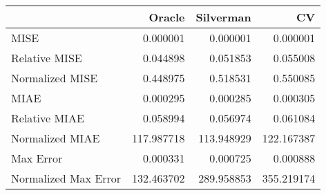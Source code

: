 \begin{tabular}{lrrr}
  \hline
 & Oracle & Silverman & CV \\ 
  \hline
MISE & 0.000001 & 0.000001 & 0.000001 \\ 
  Relative MISE & 0.044898 & 0.051853 & 0.055008 \\ 
  Normalized MISE & 0.448975 & 0.518531 & 0.550085 \\ 
  MIAE & 0.000295 & 0.000285 & 0.000305 \\ 
  Relative MIAE & 0.058994 & 0.056974 & 0.061084 \\ 
  Normalized MIAE & 117.987718 & 113.948929 & 122.167387 \\ 
  Max Error & 0.000331 & 0.000725 & 0.000888 \\ 
  Normalized Max Error & 132.463702 & 289.958853 & 355.219174 \\ 
   \hline
\end{tabular}

